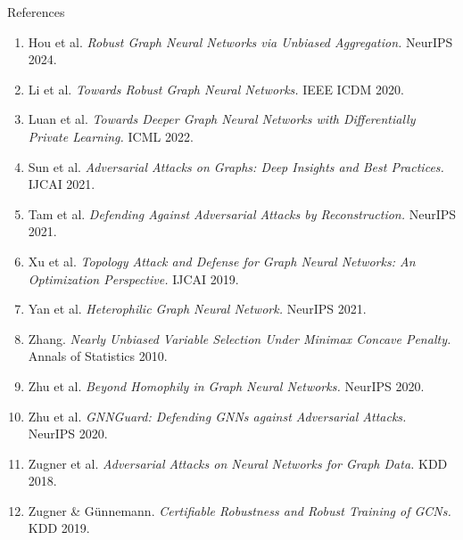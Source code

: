 \documentclass[aspectratio=169]{beamer}
\begin{document}
\begin{frame}{References}
  \tiny
  \begin{enumerate}
    \item Hou et al. \textit{Robust Graph Neural Networks via Unbiased Aggregation.} NeurIPS 2024.
    \item Li et al. \textit{Towards Robust Graph Neural Networks.} IEEE ICDM 2020.
    \item Luan et al. \textit{Towards Deeper Graph Neural Networks with Differentially Private Learning.} ICML 2022.
    \item Sun et al. \textit{Adversarial Attacks on Graphs: Deep Insights and Best Practices.} IJCAI 2021.
    \item Tam et al. \textit{Defending Against Adversarial Attacks by Reconstruction.} NeurIPS 2021.
    \item Xu et al. \textit{Topology Attack and Defense for Graph Neural Networks: An Optimization Perspective.} IJCAI 2019.
    \item Yan et al. \textit{Heterophilic Graph Neural Network.} NeurIPS 2021.
    \item Zhang. \textit{Nearly Unbiased Variable Selection Under Minimax Concave Penalty.} Annals of Statistics 2010.
    \item Zhu et al. \textit{Beyond Homophily in Graph Neural Networks.} NeurIPS 2020.
    \item Zhu et al. \textit{GNNGuard: Defending GNNs against Adversarial Attacks.} NeurIPS 2020.
    \item Zugner et al. \textit{Adversarial Attacks on Neural Networks for Graph Data.} KDD 2018.
    \item Zugner \& Günnemann. \textit{Certifiable Robustness and Robust Training of GCNs.} KDD 2019.
  \end{enumerate}
\end{frame}
\end{document}
